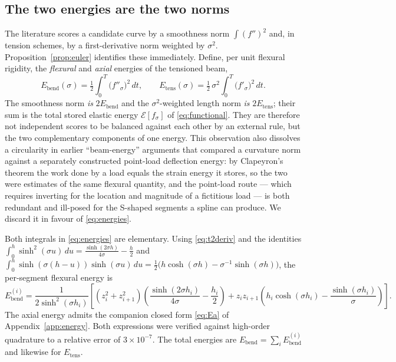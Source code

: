 \documentclass[10pt]{article}
\begin{document}
\subsection{The two energies are the two norms}
The literature scores a candidate curve by a smoothness norm $\int(f'')^2$ and, in tension
schemes, by a first-derivative norm weighted by $\sigma^2$. Proposition~\ref{prop:euler}
identifies these immediately. Define, per unit flexural rigidity, the \emph{flexural} and
\emph{axial} energies of the tensioned beam,
\begin{equation}
E_{\mathrm{bend}}(\sigma)=\tfrac12\!\int_0^T\!\big(f''_\sigma\big)^2\,dt,
\qquad
E_{\mathrm{tens}}(\sigma)=\tfrac12\,\sigma^2\!\int_0^T\!\big(f'_\sigma\big)^2\,dt .
\label{eq:energies}
\end{equation}
The smoothness norm \emph{is} $2E_{\mathrm{bend}}$ and the $\sigma^2$-weighted length norm
\emph{is} $2E_{\mathrm{tens}}$; their sum is the total stored elastic energy
$\mathcal{E}[f_\sigma]$ of \eqref{eq:functional}. They are therefore not independent scores to
be balanced against each other by an external rule, but the two complementary components of one
energy. This observation also dissolves a circularity in earlier ``beam-energy'' arguments that
compared a curvature norm against a separately constructed point-load deflection energy: by
Clapeyron's theorem the work done by a load equals the strain energy it stores, so the two were
estimates of the same flexural quantity, and the point-load route --- which requires inverting
for the location and magnitude of a fictitious load --- is both redundant and ill-posed for the
S-shaped segments a spline can produce. We discard it in favour of \eqref{eq:energies}.

Both integrals in \eqref{eq:energies} are elementary. Using \eqref{eq:t2deriv} and the
identities $\int_0^h\sinh^2(\sigma u)\,du=\tfrac{\sinh(2\sigma h)}{4\sigma}-\tfrac h2$ and
$\int_0^h\sinh(\sigma(h-u))\sinh(\sigma u)\,du=\tfrac12\big(h\cosh(\sigma h)-\sigma^{-1}\sinh(\sigma h)\big)$,
the per-segment flexural energy is
\begin{equation}
E^{(i)}_{\mathrm{bend}}=\frac{1}{2\sinh^2(\sigma h_i)}
\left[(z_i^2+z_{i+1}^2)\!\left(\frac{\sinh(2\sigma h_i)}{4\sigma}-\frac{h_i}{2}\right)
+z_i z_{i+1}\!\left(h_i\cosh(\sigma h_i)-\frac{\sinh(\sigma h_i)}{\sigma}\right)\right].
\label{eq:Eb}
\end{equation}
The axial energy admits the companion closed form \eqref{eq:Ea} of Appendix~\ref{app:energy}. Both expressions were verified against high-order quadrature to a
relative error of $3\times10^{-7}$. The total energies are
$E_{\mathrm{bend}}=\sum_i E^{(i)}_{\mathrm{bend}}$ and likewise for $E_{\mathrm{tens}}$.
\end{document}
